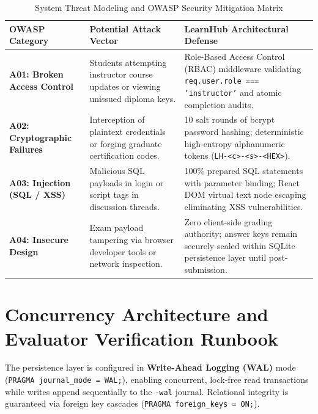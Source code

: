 \documentclass[12pt,a4paper]{report}
\begin{document}
\begin{table}[H]
\centering
\small
\begin{tabularx}{\textwidth}{p{3.5cm}Xp{5.5cm}}
\toprule
\textbf{OWASP Category} & \textbf{Potential Attack Vector} & \textbf{LearnHub Architectural Defense} \\ \midrule
\textbf{A01: Broken Access Control} & Students attempting instructor course updates or viewing unissued diploma keys. & Role-Based Access Control (RBAC) middleware validating \texttt{req.user.role === 'instructor'} and atomic completion audits. \\
\textbf{A02: Cryptographic Failures} & Interception of plaintext credentials or forging graduate certification codes. & 10 salt rounds of bcrypt password hashing; deterministic high-entropy alphanumeric tokens (\texttt{LH-<c>-<s>-<HEX>}). \\
\textbf{A03: Injection (SQL / XSS)} & Malicious SQL payloads in login or script tags in discussion threads. & 100\% prepared SQL statements with parameter binding; React DOM virtual text node escaping eliminating XSS vulnerabilities. \\
\textbf{A04: Insecure Design} & Exam payload tampering via browser developer tools or network inspection. & Zero client-side grading authority; answer keys remain securely sealed within SQLite persistence layer until post-submission. \\ \bottomrule
\end{tabularx}
\caption{System Threat Modeling and OWASP Security Mitigation Matrix}
\label{tab:owasp}
\end{table}

\section{Concurrency Architecture and Evaluator Verification Runbook}
The persistence layer is configured in \textbf{Write-Ahead Logging (WAL)} mode (\texttt{PRAGMA journal\_mode = WAL;}), enabling concurrent, lock-free read transactions while writes append sequentially to the \texttt{-wal} journal. Relational integrity is guaranteed via foreign key cascades (\texttt{PRAGMA foreign\_keys = ON;}).
\end{document}
